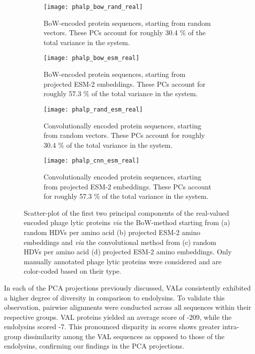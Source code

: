 \begin{figure}[ht!]
    \centering
    \begin{subfigure}[b]{0.48\textwidth}
        \texttt{[image: phalp\_bow\_rand\_real]}
        \caption{BoW-encoded protein sequences, starting from random vectors. These PCs account for roughly 30.4 \% of the total variance in the system.}
    \label{fig:phalpbowrandr}
    \end{subfigure}
        \hfill
    \begin{subfigure}[b]{0.48\textwidth}
        \texttt{[image: phalp\_bow\_esm\_real]}
        \caption{BoW-encoded protein sequences, starting from projected ESM-2 embeddings. These PCs account for roughly 57.3 \% of the total variance in the system.}
    \label{fig:phalpbowesmr}
    \end{subfigure}
    \begin{subfigure}[b]{0.48\textwidth}
        \texttt{[image: phalp\_rand\_esm\_real]}
        \caption{Convolutionally encoded protein sequences, starting from random vectors. These PCs account for roughly 30.4 \% of the total variance in the system.}
    \label{fig:phalpcnnrandr}
    \end{subfigure}
    \hfill
    \begin{subfigure}[b]{0.48\textwidth}
        \texttt{[image: phalp\_cnn\_esm\_real]}
        \caption{Convolutionally encoded protein sequences, starting from projected ESM-2 embeddings. These PCs account for roughly 57.3 \% of the total variance in the system.}
    \label{fig:phalpcnnesmr}
    \end{subfigure}
    \caption{Scatter-plot of the first two principal components of the real-valued encoded phage lytic proteins \textit{via} the BoW-method starting from (a) random HDVs per amino acid (b) projected ESM-2 amino embeddings and \textit{via} the convolutional method from (c) random HDVs per amino acid (d) projected ESM-2 amino embeddings. Only manually annotated phage lytic proteins were considered and are color-coded based on their type.}\label{fig:phalp_embr}
\end{figure}

In each of the PCA projections previously discussed, VALs consistently exhibited a higher degree of diversity in comparison to endolysins. To validate this observation, pairwise alignments were conducted across all sequences within their respective groups. VAL proteins yielded an average score of -209, while the endolysins scored -7. This pronounced disparity in scores shows greater intra-group dissimilarity among the VAL sequences as opposed to those of the endolysins, confirming our findings in the PCA projections.

